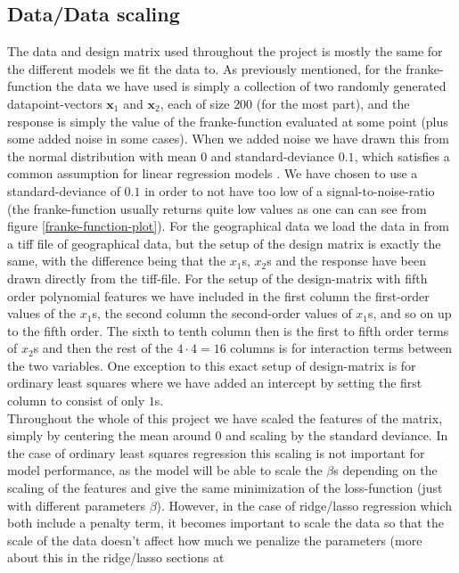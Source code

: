 \documentclass{article}
\begin{document}
\subsection{Data/Data scaling}
The data and design matrix used throughout the project is mostly the same for
the different models we fit the data to. As previously mentioned, for the
franke-function the data we have used is simply a collection of two randomly
generated datapoint-vectors $\mathbf{x}_1$ and $\mathbf{x}_2$, each of size
$200$ (for the most part), and the response is simply the value of the
franke-function evaluated at some point (plus some added noise in some cases).
When we added noise we have drawn this from the normal distribution with mean
$0$ and standard-deviance $0.1$, which satisfies a common assumption for linear
regression models \cite[s.~1.4.5]{murphy2012machine}. We have chosen to use a
standard-deviance of $0.1$ in order to not have too low of a
signal-to-noise-ratio (the franke-function usually returns quite low values as
one can can see from figure \ref{franke-function-plot}). For the geographical
data we load the data in from a tiff file of geographical data, but the setup of
the design matrix is exactly the same, with the difference being that the
$x_1$s, $x_2$s and the response have been drawn directly from the tiff-file.
For the setup of the design-matrix with fifth order polynomial features we have
included in the first column the first-order values of the $x_1$s, the second
column the second-order values of $x_1$s, and so on up to the fifth order.  The
sixth to tenth column then is the first to fifth order terms of $x_2$s and then
the rest of the $4 \cdot 4 = 16$ columns is for interaction terms between the
two variables. One exception to this exact setup of design-matrix is for
ordinary least squares where we have added an intercept by setting the first
column to consist of only $1$s.
\\
Throughout the whole of this project we have scaled the features of the matrix,
simply by centering the mean around $0$ and scaling by the standard deviance. In
the case of ordinary least squares regression this scaling is not important for
model performance, as the model will be able to scale the $\beta$s depending on
the scaling of the features and give the same minimization of the loss-function
(just with different parameters $\beta$).  However, in the case of ridge/lasso
regression which both include a penalty term, it becomes important to scale the
data so that the scale of the data doesn't affect how much we penalize the
parameters (more about this in the ridge/lasso sections at
\end{document}
